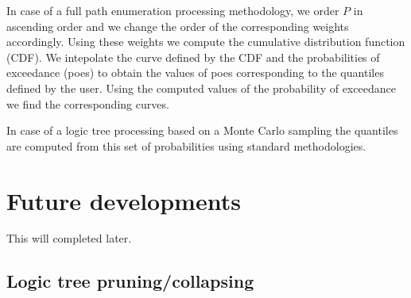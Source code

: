 In case of a full path enumeration processing methodology, we order $P$
in ascending order and we change the order of the corresponding 
weights accordingly. Using these weights we compute the cumulative 
distribution function (CDF). 
%
We intepolate the curve defined by the CDF and the probabilities of 
exceedance (poes) to obtain the values of poes corresponding to the 
quantiles defined by the user. 
%
Using the computed values of the probability of exceedance we find 
the corresponding curves.

In case of a logic tree processing based on a Monte Carlo sampling the 
quantiles are computed from this set of probabilities using standard
methodologies.
%
\clearpage
\section{Future developments}
This will completed later.
%
\subsection{Logic tree pruning/collapsing}
